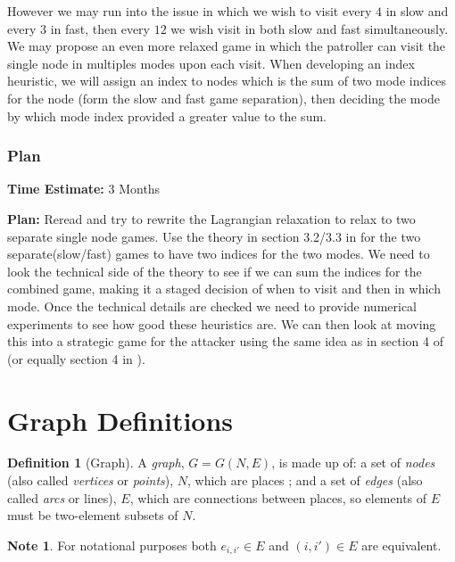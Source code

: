 \documentclass[a4paper,10pt]{article}
\theoremstyle{definition}
\newtheorem{definition}[theorem]{Definition}
\theoremstyle{definition}
\theoremstyle{remark}
\theoremstyle{definition}
\newtheorem*{note}{Note}
\begin{document}
However we may run into the issue in which we wish to visit every $4$ in slow and every $3$ in fast, then every $12$ we wish visit in both slow and fast simultaneously. We may propose an even more relaxed game in which the patroller can visit the single node in multiples modes upon each visit. When developing an index heuristic, we will assign an index to nodes which is the sum of two mode indices for the node (form the slow and fast game separation), then deciding the mode by which mode index provided a greater value to the sum.

\subsubsection{Plan}
\textbf{Time Estimate:} 3 Months

\textbf{Plan:} Reread \cite{Lin2014} and try to rewrite the Lagrangian relaxation to relax to two separate single node games. Use the theory in section 3.2/3.3 in \cite{Lin2014} for the two separate(slow/fast) games to have two indices for the two modes. We need to look the technical side of the theory to see if we can sum the indices for the combined game, making it a staged decision of when to visit and then in which mode. Once the technical details are checked we need to provide numerical experiments to see how good these heuristics are. We can then look at moving this into a strategic game for the attacker using the same idea as in section 4 of \cite{Lin2014}(or equally section 4 in \cite{Lin2013}).




\newpage
\appendix
{}
\appendixpage
\addappheadtotoc
\section{Graph Definitions}
\label{Appendix:Graph Definitions}
\begin{definition}[Graph]
A \textit{graph}, $G=G(N,E)$, is made up of: a set of \textit{nodes} (also called \textit{vertices} or \textit{points}), $N$, which are places ; and a set of \textit{edges} (also called \textit{arcs} or lines), $E$, which are connections between places, so elements of $E$ must be two-element subsets of $N$.
\end{definition}

\begin{note}
For notational purposes both $e_{i,i'} \in E$ and $(i,i') \in E$ are equivalent.
\end{note}
\end{document}
